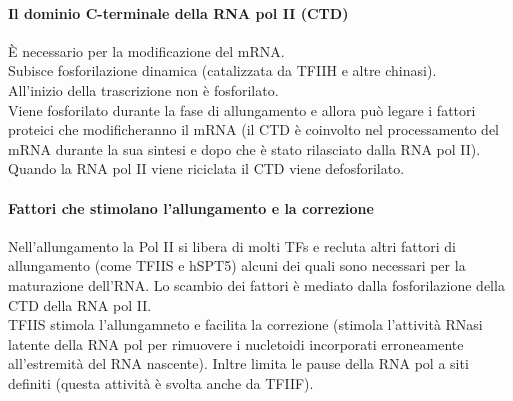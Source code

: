 \documentclass{article}
\begin{document}
\paragraph{Il dominio C-terminale della RNA pol II (CTD)}
È necessario per la modificazione del mRNA.\\
Subisce fosforilazione dinamica (catalizzata da TFIIH e altre chinasi).\\
All'inizio della trascrizione non è fosforilato.\\
Viene fosforilato durante la fase di allungamento e allora può legare i fattori proteici che modificheranno il mRNA (il CTD è coinvolto nel processamento del mRNA durante la sua sintesi e dopo che è stato rilasciato dalla RNA pol II).\\
Quando la RNA pol II viene riciclata il CTD viene defosforilato.
\paragraph{Fattori che stimolano l'allungamento e la correzione}
Nell'allungamento la Pol II si libera di molti TFs e recluta altri fattori di allungamento (come TFIIS e hSPT5) alcuni dei quali sono necessari per la maturazione dell'RNA. Lo scambio dei fattori è mediato dalla fosforilazione della CTD della RNA pol II.\\
TFIIS stimola l'allungamneto e facilita la correzione (stimola l'attività RNasi latente della RNA pol per rimuovere i nucletoidi incorporati erroneamente all'estremità del RNA nascente). Inltre limita le pause della RNA pol a siti definiti (questa attività è svolta anche da TFIIF).
\end{document}
